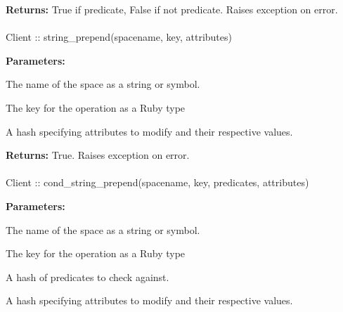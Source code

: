 \noindent\textbf{Returns:}
True if predicate, False if not predicate.  Raises exception on error.

\paragraph{}
\label{api:ruby:string_prepend}
\begin{rubycode}
Client :: string_prepend(spacename, key, attributes)
\end{rubycode}


\noindent\textbf{Parameters:}
\begin{description}[labelindent=\widthof{{\code{attributes}}},leftmargin=*,noitemsep,nolistsep,align=right]
\item[\code{spacename}] The name of the space as a string or symbol.
\item[\code{key}] The key for the operation as a Ruby type
\item[\code{attributes}] A hash specifying attributes to modify and their respective values.
\end{description}

\noindent\textbf{Returns:}
True.  Raises exception on error.

\paragraph{}
\label{api:ruby:cond_string_prepend}
\begin{rubycode}
Client :: cond_string_prepend(spacename, key, predicates, attributes)
\end{rubycode}


\noindent\textbf{Parameters:}
\begin{description}[labelindent=\widthof{{\code{predicates}}},leftmargin=*,noitemsep,nolistsep,align=right]
\item[\code{spacename}] The name of the space as a string or symbol.
\item[\code{key}] The key for the operation as a Ruby type
\item[\code{predicates}] A hash of predicates to check against.
\item[\code{attributes}] A hash specifying attributes to modify and their respective values.
\end{description}

